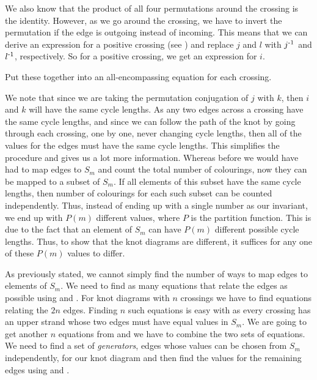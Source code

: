 \begin{paper}

We also know that the product of all four permutations around the crossing is
the identity.
However, as we go around the crossing, we have to invert the permutation if the
edge is outgoing instead of incoming.
This means that we can derive an expression for a positive crossing (see
\figCrossings) and replace $j$ and $l$ with $j^{\text-1}$ and $l^{\text-1}$,
respectively.
So for a positive crossing, we get an expression for $i$.


Put these together into an all-encompassing equation for each crossing.



We note that since we are taking the permutation conjugation of $j$ with $k$,
then $i$ and $k$ will have the same cycle lengths.
As any two edges across a crossing have the same cycle lengths, and since we can
follow the path of the knot by going through each crossing, one by one, never
changing cycle lengths, then all of the values for the edges must have the same
cycle lengths.
This simplifies the procedure and gives us a lot more information.
Whereas before we would have had to map edges to $S_m$ and count the total
number of colourings, now they can be mapped to a subset of $S_m$.
If all elements of this subset have the same cycle lengths, then number of
colourings for each such subset can be counted independently.
Thus, instead of ending up with a single number as our invariant, we end up with
$P(m)$ different values, where $P$ is the partition function.
This is due to the fact that an element of $S_m$ can have $P(m)$ different
possible cycle lengths.
Thus, to show that the knot diagrams are different, it suffices for any one of
these $P(m)$ values to differ.

As previously stated, we cannot simply find the number of ways to map edges to
elements of $S_m$.
We need to find as many equations that relate the edges as possible using
\eqUpper and \eqLower.
For knot diagrams with $n$ crossings we have to find equations relating the $2n$
edges.
Finding $n$ such equations is easy with \eqUpper as every crossing has an upper
strand whose two edges must have equal values in $S_m$.
We are going to get another $n$ equations from \eqBoth and we have to combine
the two sets of equations.
We need to find a set of \textit{generators}, edges whose values can be chosen
from $S_m$ independently, for our knot diagram and then find the values for the
remaining edges using \eqUpper and \eqBoth.


\end{paper}
